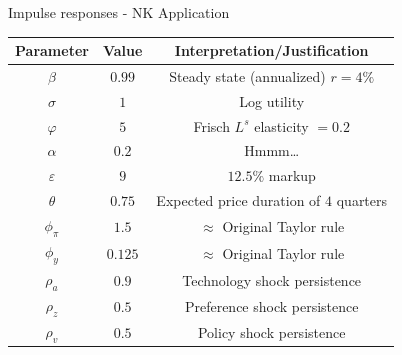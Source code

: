 \documentclass{beamer}
\begin{document}

	
\begin{frame}{Impulse responses - NK Application}

\begin{table}
\begin{tabular}{ c | c | c }
\textbf{Parameter} 	& \textbf{Value} 	& \textbf{Interpretation/Justification} 		\\ \hline \hline
  $\beta$ 			& $0.99$		& Steady state (annualized) $r=4\%$		\\
  $\sigma$			& $1$			& Log utility								\\
  $\varphi$			& $5$			& Frisch $L^{s}$ elasticity $=0.2$			\\
  $\alpha$			& $0.2$			& Hmmm\ldots							\\
  $\varepsilon$		& $9$			& $12.5\%$ markup						\\
  $\theta$			& $0.75$		& Expected price duration of $4$ quarters	\\
  $\phi_{\pi}$		& $1.5$			& $\approx$ Original Taylor rule			\\
  $\phi_{y}$			& $0.125$		& $\approx$ Original Taylor rule			\\
  $\rho_{a}$			& $0.9$			& Technology shock persistence			\\
  $\rho_{z}$			& $0.5$			& Preference shock persistence				\\
  $\rho_{v}$			& $0.5$			& Policy shock persistence					\\ \hline \hline
\end{tabular}
\end{table}

\end{frame}


	
\end{document}
